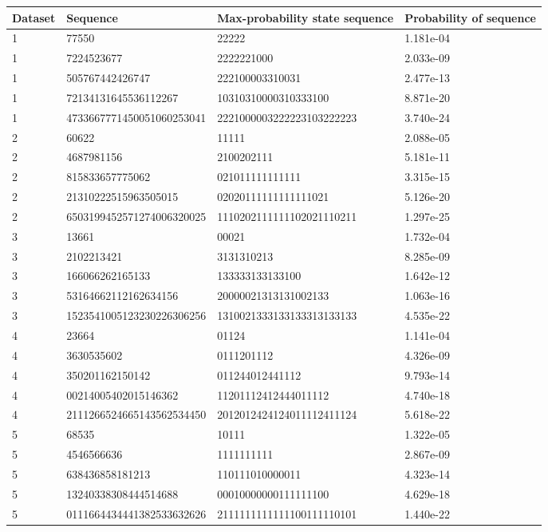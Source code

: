 \documentclass{article}
\begin{document}
\begin{solution}
	
\begin{center}
  \begin{tabular}{ l | l |l | l }
Dataset & Sequence & Max-probability state sequence & Probability of sequence  \\ \hline
1 & 77550                       & 22222                     & 1.181e-04\\
1 & 7224523677                  & 2222221000                & 2.033e-09\\
1 & 505767442426747             & 222100003310031           & 2.477e-13\\
1 & 72134131645536112267        & 10310310000310333100      & 8.871e-20\\
1 & 4733667771450051060253041   & 2221000003222223103222223 & 3.740e-24
 \\ \hline
2 & 60622                       & 11111                     & 2.088e-05\\
2 & 4687981156                  & 2100202111                & 5.181e-11\\
2 & 815833657775062             & 021011111111111           & 3.315e-15\\
2 & 21310222515963505015        & 02020111111111111021      & 5.126e-20\\
2 & 6503199452571274006320025   & 1110202111111102021110211 & 1.297e-25
 \\ \hline
3 & 13661                       & 00021                     & 1.732e-04\\
3 & 2102213421                  & 3131310213                & 8.285e-09\\
3 & 166066262165133             & 133333133133100           & 1.642e-12\\
3 & 53164662112162634156        & 20000021313131002133      & 1.063e-16\\
3 & 1523541005123230226306256   & 1310021333133133313133133 & 4.535e-22
 \\ \hline
4 & 23664                       & 01124                     & 1.141e-04\\
4 & 3630535602                  & 0111201112                & 4.326e-09\\
4 & 350201162150142             & 011244012441112           & 9.793e-14\\
4 & 00214005402015146362        & 11201112412444011112      & 4.740e-18\\
4 & 2111266524665143562534450   & 2012012424124011112411124 & 5.618e-22
 \\ \hline
5 & 68535                       & 10111                     & 1.322e-05\\
5 & 4546566636                  & 1111111111                & 2.867e-09\\
5 & 638436858181213             & 110111010000011           & 4.323e-14\\
5 & 13240338308444514688        & 00010000000111111100      & 4.629e-18\\
5 & 0111664434441382533632626   & 2111111111111100111110101 & 1.440e-22
 \\ \hline


\end{tabular}
\end{center}
\end{solution}
\end{document}
